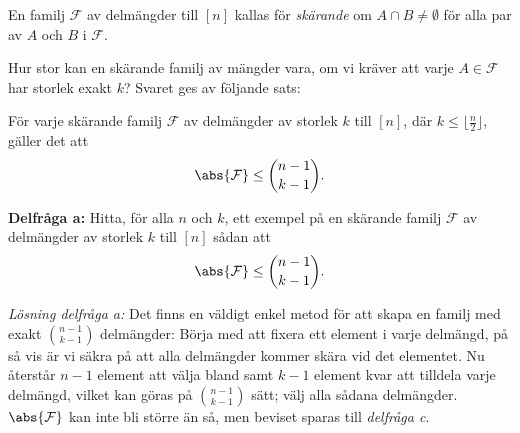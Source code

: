 \documentclass[nobib]{tufte-handout}
\begin{document}
\begin{xca}
    \begin{definition}
        En familj $\mathcal{F}$ av delmängder till $[n]$ kallas för \emph{skärande} om $A \cap B \neq \emptyset$ för alla par av $A$ och $B$ i $\mathcal{F}$.
    \end{definition}

    Hur stor kan en skärande familj av mängder vara, om vi kräver att varje $A \in \mathcal{F}$ har storlek exakt $k$? Svaret ges av följande sats:

    \begin{theorem}
        För varje skärande familj $\mathcal{F}$ av delmängder av storlek $k$ till $[n]$, där $k \leq \lfloor \frac{n}{2} \rfloor$, gäller det att
        $$\abs{\mathcal{F}} \leq \binom{n-1}{k-1}.$$
    \end{theorem}

    \textbf{Delfråga a:} Hitta, för alla $n$ och $k$, ett exempel på en skärande familj $\mathcal{F}$ av delmängder av storlek $k$ till $[n]$ sådan att
    $$\abs{\mathcal{F}} \leq \binom{n-1}{k-1}.$$

    \textit{Lösning delfråga a:} Det finns en väldigt enkel metod för att skapa en familj med exakt $\binom{n-1}{k-1}$ delmängder: Börja med att fixera ett element i varje delmängd, på så vis är vi säkra på att alla delmängder kommer skära vid det elementet. Nu återstår $n-1$ element att välja bland samt $k-1$ element kvar att tilldela varje delmängd, vilket kan göras på $\binom{n-1}{k-1}$ sätt; välj alla sådana delmängder. $\abs{\mathcal{F}}$ kan inte bli större än så, men beviset sparas till \textit{delfråga c}.
    \\ 
    
\end{xca}
\end{document}
